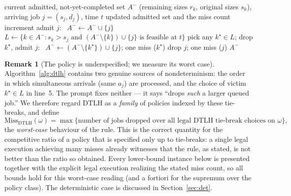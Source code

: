 \documentclass{amsart}
\theoremstyle{definition}
\newtheorem{remark}[theorem]{Remark}
\begin{document}
\begin{algorithm}[h]
\caption{DTLH admission decision at the arrival of job $j$ at time $t$}
\label{alg:dtlh}
\begin{algorithmic}[1]
\Require current admitted, not-yet-completed set $A^-$ (remaining sizes $r_k$, original sizes $s_k$), arriving job $j=(s_j,d_j)$, time $t$
\Ensure updated admitted set and the miss count increment
  \State admit $j$: \ $A^-\gets A^-\cup\{j\}$
\Else
  \State $L\gets\{k\in A^- : s_k> s_j \text{ and } (A^-\setminus\{k\})\cup\{j\}\text{ is feasible at }t\}$
    \State pick any $k^\star\in L$; drop $k^\star$, admit $j$: \ $A^-\gets(A^-\setminus\{k^\star\})\cup\{j\}$; one miss ($k^\star$)
  \Else
    \State drop $j$; one miss ($j$)
  \EndIf
\EndIf
\State \Return $A^-$
\end{algorithmic}
\end{algorithm}

\begin{remark}[The policy is underspecified; we measure its worst case]
\label{rem:tiebreak}
Algorithm~\ref{alg:dtlh} contains two genuine sources of nondeterminism: the
order in which simultaneous arrivals (same $a_j$) are processed, and the choice
of victim $k^\star\in L$ in line~5. The prompt fixes neither --- it says
``drops \emph{such} a larger queued job.'' We therefore regard DTLH as a
\emph{family} of policies indexed by these tie-breaks, and define
\[
\mathrm{Miss}_{\mathrm{DTLH}}(\omega)
=\max\{\text{number of jobs dropped over all legal DTLH tie-break choices on }\omega\},
\]
the \emph{worst-case} behaviour of the rule. This is the correct quantity for
the competitive ratio of a policy that is specified only up to tie-breaks: a
single legal execution achieving many misses already witnesses that the rule, as
stated, is not better than the ratio so obtained. Every lower-bound instance
below is presented together with the explicit legal execution realizing the
stated miss count, so all bounds hold for this worst-case reading (and a
fortiori for the supremum over the policy class). The deterministic case is
discussed in Section~\ref{sec:det}.
\end{remark}
\end{document}

